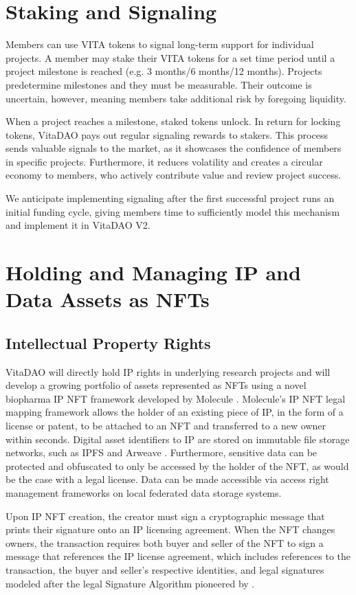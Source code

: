 \documentclass[12pt,letterpaper]{article}
\begin{document}
\section{Staking and Signaling}
Members can use VITA tokens to signal long-term support for individual projects. A member may stake their VITA tokens for a set time period until a project milestone is reached (e.g. 3 months/6 months/12 months). Projects predetermine milestones and they must be measurable. Their outcome is uncertain, however, meaning members take additional risk by foregoing liquidity. 

When a project reaches a milestone, staked tokens unlock. In return for locking tokens, VitaDAO pays out regular signaling rewards to stakers. This process sends valuable signals to the market, as it showcases the confidence of members in specific projects. Furthermore, it reduces volatility and creates a circular economy to members, who actively contribute value and review project success. 

We anticipate implementing signaling after the first successful project runs an initial funding cycle, giving members time to sufficiently model this mechanism and implement it in VitaDAO V2.

\section{Holding and Managing IP and Data Assets as NFTs}

\subsection{Intellectual Property Rights}
VitaDAO will directly hold IP rights in underlying research projects and will develop a growing portfolio of assets represented as NFTs using a novel biopharma IP NFT framework developed by Molecule \citep{Kohlhaas}. Molecule’s IP NFT legal mapping framework allows the holder of an existing piece of IP, in the form of a license or patent, to be attached to an NFT and transferred to a new owner within seconds. Digital asset identifiers to IP are stored on immutable file storage networks, such as IPFS \citep{IPFS} and Arweave \citep{Arweave}. Furthermore, sensitive data can be protected and obfuscated to only be accessed by the holder of the NFT, as would be the case with a legal license. Data can be made accessible via access right management frameworks on local federated data storage systems.

Upon IP NFT creation, the creator must sign a cryptographic message that prints their signature onto an IP licensing agreement. When the NFT changes owners, the transaction requires both buyer and seller of the NFT to sign a message that references the IP license agreement, which includes references to the transaction, the buyer and seller’s respective identities, and legal signatures modeled after the legal Signature Algorithm pioneered by \citep{OpenLaw2019}. 
\end{document}
